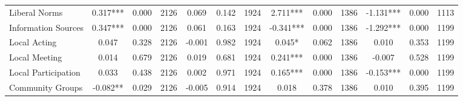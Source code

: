 \begin{tabular}{l*{12}{c}}
 Liberal Norms &        0.317*** &        0.000 & 2126    &        0.069 &        0.142 & 1924    &        2.711*** &        0.000 & 1386 &       -1.131*** &        0.000 & 1113 \\ 

 Information Sources &        0.347*** &        0.000 & 2126    &        0.061 &        0.163 & 1924    &       -0.341*** &        0.000 & 1386 &       -1.292*** &        0.000 & 1199 \\ 

 Local Acting &        0.047 &        0.328 & 2126    &       -0.001 &        0.982 & 1924    &        0.045* &        0.062 & 1386 &        0.010 &        0.353 & 1199 \\ 

 Local Meeting &        0.014 &        0.679 & 2126    &        0.019 &        0.681 & 1924    &        0.241*** &        0.000 & 1386 &       -0.007 &        0.528 & 1199 \\ 

 Local Participation &        0.033 &        0.438 & 2126    &        0.002 &        0.971 & 1924    &        0.165*** &        0.000 & 1386 &       -0.153*** &        0.000 & 1199 \\ 

 Community Groups &       -0.082** &        0.029 & 2126    &       -0.005 &        0.914 & 1924    &        0.018 &        0.378 & 1386 &        0.010 &        0.395 & 1199 \\ 

\hline \end{tabular}
